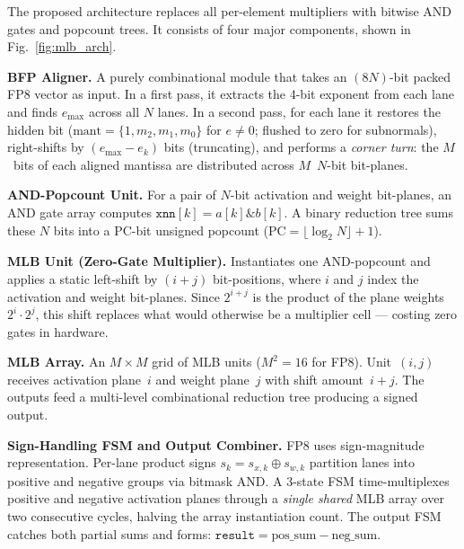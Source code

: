 \documentclass[conference]{IEEEtran}
\begin{document}
The proposed architecture replaces all per-element multipliers with
bitwise AND gates and popcount trees.  It consists of four major
components, shown in Fig.~\ref{fig:mlb_arch}.

\textbf{BFP Aligner.}
A purely combinational module that takes an $(8N)$-bit packed FP8
vector as input.  In a first pass, it extracts the 4-bit exponent
from each lane and finds $e_{\max}$ across all $N$ lanes.  In a
second pass, for each lane it restores the hidden bit
($\text{mant} = \{1, m_2, m_1, m_0\}$ for $e \neq 0$; flushed to
zero for subnormals), right-shifts by $(e_{\max} - e_k)$ bits
(truncating), and performs a \emph{corner turn}: the $M$~bits of each
aligned mantissa are distributed across $M$~$N$-bit bit-planes.

\textbf{AND-Popcount Unit.}
For a pair of $N$-bit activation and weight bit-planes, an AND gate
array computes $\texttt{xnn}[k] = a[k] \mathbin{\&} b[k]$.  A
binary reduction tree sums these $N$ bits into a
$\text{PC}$-bit unsigned popcount
($\text{PC} = \lfloor \log_2 N \rfloor + 1$).

\textbf{MLB Unit (Zero-Gate Multiplier).}
Instantiates one AND-popcount and applies a static left-shift by
$(i+j)$ bit-positions, where $i$ and $j$ index the activation
and weight bit-planes.  Since $2^{i+j}$ is the product of the plane
weights $2^i \cdot 2^j$, this shift replaces what would otherwise
be a multiplier cell --- costing zero gates in hardware.

\textbf{MLB Array.}
An $M \times M$ grid of MLB units ($M^2 = 16$ for FP8).
Unit~$(i,j)$ receives activation plane~$i$ and weight plane~$j$
with shift amount~$i + j$.  The outputs feed a multi-level
combinational reduction tree producing a signed output.

\textbf{Sign-Handling FSM and Output Combiner.}
FP8 uses sign-magnitude representation.  Per-lane product signs
$s_k = s_{x,k} \oplus s_{w,k}$ partition lanes into positive and
negative groups via bitmask AND.  A 3-state FSM time-multiplexes
positive and negative activation planes through a \emph{single
shared} MLB array over two consecutive cycles, halving the array
instantiation count.  The output FSM catches both partial sums and
forms: $\texttt{result} = \text{pos\_sum} - \text{neg\_sum}$.
\end{document}
